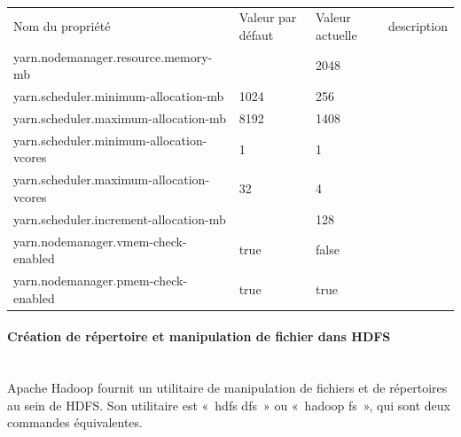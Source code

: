 \documentclass[12pt,english]{book}
\begin{document}
\begin{table}[H]
\begin{tabular}{llll}
\rowcolor[HTML]{4472C4} 
{\color[HTML]{FFFFFF} Nom du propriété}  & {\color[HTML]{FFFFFF} Valeur par défaut} & {\color[HTML]{FFFFFF} Valeur actuelle} & {\color[HTML]{FFFFFF} description} \\
\rowcolor[HTML]{D9E2F3} 
yarn.nodemanager.resource.memory-mb      &                                          & 2048                                   &                                    \\
yarn.scheduler.minimum-allocation-mb     & 1024                                     & 256                                    &                                    \\
\rowcolor[HTML]{D9E2F3} 
yarn.scheduler.maximum-allocation-mb     & 8192                                     & 1408                                   &                                    \\
yarn.scheduler.minimum-allocation-vcores & 1                                        & 1                                      &                                    \\
\rowcolor[HTML]{D9E2F3} 
yarn.scheduler.maximum-allocation-vcores & 32                                       & 4                                      &                                    \\
yarn.scheduler.increment-allocation-mb   &                                          & 128                                    &                                    \\
\rowcolor[HTML]{D9E2F3} 
yarn.nodemanager.vmem-check-enabled      & true                                     & false                                  &                                    \\
yarn.nodemanager.pmem-check-enabled      & true                                     & true                                   &                                   
\end{tabular}
\caption{}
\end{table}

\paragraph{Création de répertoire et manipulation de fichier dans HDFS}\mbox{}\\

Apache Hadoop fournit un utilitaire de manipulation de fichiers et de répertoires au sein de HDFS. Son utilitaire est « hdfs dfs » ou « hadoop fs », qui sont deux commandes équivalentes.
\end{document}
